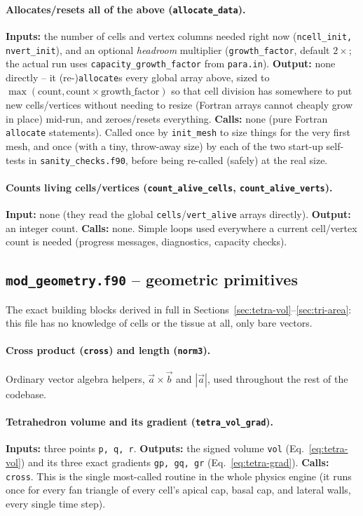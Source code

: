 \documentclass[11pt,a4paper]{report}
\begin{document}
\paragraph{Allocates/resets all of the above (\texttt{allocate\_data}).}
\textbf{Inputs:} the number of cells and vertex columns needed right
now (\texttt{ncell\_init, nvert\_init}), and an optional
\emph{headroom} multiplier (\texttt{growth\_factor}, default
$2\times$; the actual run uses \texttt{capacity\_growth\_factor} from
\texttt{para.in}). \textbf{Output:} none directly -- it
(re-)\texttt{allocate}s every global array above, sized to
$\max(\text{count}, \text{count}\times\text{growth\_factor})$ so that
cell division has somewhere to put new cells/vertices without needing
to resize (Fortran arrays cannot cheaply grow in place) mid-run, and
zeroes/resets everything. \textbf{Calls:} none (pure Fortran
\texttt{allocate} statements). Called once by \texttt{init\_mesh} to
size things for the very first mesh, and once (with a tiny,
throw-away size) by each of the two start-up self-tests in
\texttt{sanity\_checks.f90}, before being re-called (safely) at the
real size.

\paragraph{Counts living cells/vertices (\texttt{count\_alive\_cells},
\texttt{count\_alive\_verts}).} \textbf{Input:} none (they read the
global \texttt{cells}/\texttt{vert\_alive} arrays directly).
\textbf{Output:} an integer count. \textbf{Calls:} none. Simple loops
used everywhere a current cell/vertex count is needed (progress
messages, diagnostics, capacity checks).

\subsection{\texttt{mod\_geometry.f90} -- geometric primitives}
The exact building blocks derived in full in
Sections~\ref{sec:tetra-vol}--\ref{sec:tri-area}: this file has no
knowledge of cells or the tissue at all, only bare vectors.
\paragraph{Cross product (\texttt{cross}) and length (\texttt{norm3}).}
Ordinary vector algebra helpers, $\vec a\times\vec b$ and $|\vec a|$,
used throughout the rest of the codebase.
\paragraph{Tetrahedron volume and its gradient (\texttt{tetra\_vol\_grad}).}
\textbf{Inputs:} three points \texttt{p, q, r}. \textbf{Outputs:} the
signed volume \texttt{vol} (Eq.~\ref{eq:tetra-vol}) and its three exact
gradients \texttt{gp, gq, gr} (Eq.~\ref{eq:tetra-grad}).
\textbf{Calls:} \texttt{cross}. This is the single most-called routine
in the whole physics engine (it runs once for every fan triangle of
every cell's apical cap, basal cap, and lateral walls, every single
time step).
\end{document}

